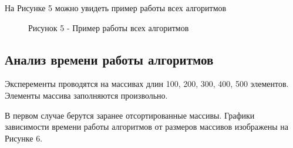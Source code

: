 \documentclass[14pt, a4paper]{extarticle}
\begin{document}
	\newpage
	На Рисунке 5 можно увидеть пример работы всех алгоритмов
	\begin{figure}[h]
		\caption*{Рисунок 5 - Пример работы всех алгоритмов}
	\end{figure}


	\subsection{Анализ времени работы алгоритмов }
	Эксперементы проводятся на массивах длин 100, 200, 300, 400, 500 элементов. Элементы массива заполняются произвольно.
	
	В первом случае берутся заранее отсортированные массивы. 
	Графики зависимости времени работы алгоритмов от размеров массивов изображены на Рисунке 6.
	
\end{document}
